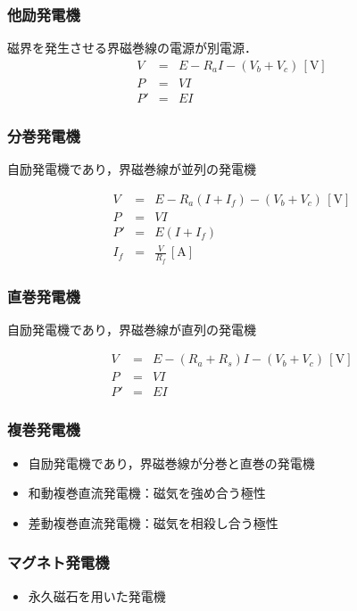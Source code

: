 \subsubsection{他励発電機}
磁界を発生させる界磁巻線の電源が別電源．
\begin{eqnarray}
  V &=& E-R_a I - (V_b + V_c)\, [\textrm{V}] \\
  P &=& VI \\
  P' &=& EI
\end{eqnarray}

\subsubsection{分巻発電機}
自励発電機であり，界磁巻線が並列の発電機


\begin{eqnarray}
  V &=& E-R_a (I+I_f) - (V_b + V_c)\, [\textrm{V}] \\
  P &=& VI \\
  P' &=& E(I+I_f) \\
  I_f &=&\frac{V}{R_f}\, [\textrm{A}]
\end{eqnarray}

\subsubsection{直巻発電機}
自励発電機であり，界磁巻線が直列の発電機


\begin{eqnarray}
  V &=& E-(R_a+R_s)I - (V_b + V_c)\, [\textrm{V}] \\
  P &=& VI \\
  P' &=& EI
\end{eqnarray}

\subsubsection{複巻発電機}
\begin{itemize}
  \item 自励発電機であり，界磁巻線が分巻と直巻の発電機
  \item 和動複巻直流発電機：磁気を強め合う極性
  \item 差動複巻直流発電機：磁気を相殺し合う極性
\end{itemize}

\subsubsection{マグネト発電機}
\begin{itemize}
  \item 永久磁石を用いた発電機
\end{itemize}

